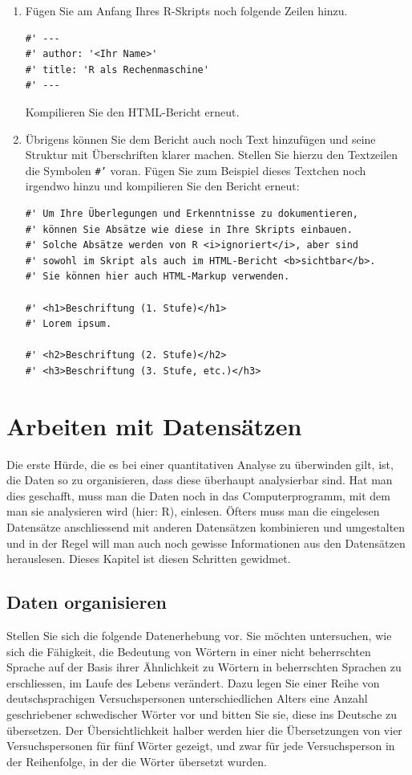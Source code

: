 \documentclass[oneside, 10pt]{book}\usepackage[]{graphicx}\usepackage[]{xcolor}
\begin{document}
\begin{enumerate}
\begin{enumerate}
    \item Fügen Sie am Anfang Ihres R-Skripts noch folgende Zeilen hinzu.
\begin{verbatim}
#' ---
#' author: '<Ihr Name>'
#' title: 'R als Rechenmaschine'
#' ---
\end{verbatim}
    Kompilieren Sie den HTML-Bericht erneut.

    \item Übrigens können Sie dem Bericht auch noch Text hinzufügen
    und seine Struktur mit Überschriften klarer machen. Stellen Sie
    hierzu den Textzeilen die Symbolen \texttt{\#'} voran. Fügen
    Sie zum Beispiel dieses Textchen noch irgendwo hinzu und 
    kompilieren Sie den Bericht erneut:
\begin{verbatim}
#' Um Ihre Überlegungen und Erkenntnisse zu dokumentieren,
#' können Sie Absätze wie diese in Ihre Skripts einbauen.
#' Solche Absätze werden von R <i>ignoriert</i>, aber sind
#' sowohl im Skript als auch im HTML-Bericht <b>sichtbar</b>.
#' Sie können hier auch HTML-Markup verwenden.

#' <h1>Beschriftung (1. Stufe)</h1>
#' Lorem ipsum.
 
#' <h2>Beschriftung (2. Stufe)</h2>
#' <h3>Beschriftung (3. Stufe, etc.)</h3>
\end{verbatim}

    \end{enumerate}
\end{enumerate}


\chapter{Arbeiten mit Datensätzen}\label{ch:datenaufbereiten}
Die erste Hürde, die es bei einer quantitativen Analyse
zu überwinden gilt, ist, die Daten so zu organisieren,
dass diese überhaupt analysierbar sind. Hat man dies
geschafft, muss man die Daten noch in das Computerprogramm, 
mit dem man sie analysieren wird (hier: R), einlesen.
Öfters muss man die eingelesen Datensätze anschliessend
mit anderen Datensätzen kombinieren und umgestalten
und in der Regel will man auch noch gewisse Informationen
aus den Datensätzen herauslesen. Dieses Kapitel ist
diesen Schritten gewidmet.

\section{Daten organisieren}
Stellen Sie sich die folgende Datenerhebung vor.
Sie möchten untersuchen, wie sich die Fähigkeit,
die Bedeutung von Wörtern in einer nicht beherrschten 
Sprache auf der Basis ihrer Ähnlichkeit zu Wörtern
in beherrschten Sprachen zu erschliessen, im Laufe
des Lebens verändert. Dazu legen Sie einer Reihe von
deutschsprachigen Versuchspersonen unterschiedlichen
Alters eine Anzahl geschriebener schwedischer Wörter vor
und bitten Sie sie, diese ins Deutsche zu übersetzen.
Der Übersichtlichkeit halber werden hier die Übersetzungen
von vier Versuchspersonen für fünf Wörter gezeigt,
und zwar für jede Versuchsperson in der Reihenfolge,
in der die Wörter übersetzt wurden.
\end{document}
